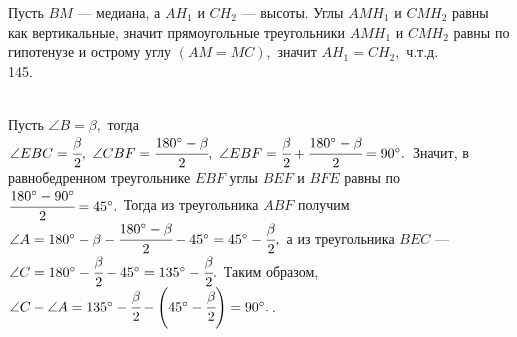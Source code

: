 \documentclass[12pt]{article}
\begin{document}
Пусть $BM$ --- медиана, а $AH_1$ и $CH_2$ --- высоты. Углы $AMH_1$ и $CMH_2$ равны как вертикальные, значит прямоугольные треугольники $AMH_1$ и $CMH_2$ равны по гипотенузе и острому углу $(AM=MC),$ значит $AH_1=CH_2,$ ч.т.д.\\
145. \begin{figure}[ht!]
\end{figure}\\
Пусть $\angle B=\beta,$ тогда $\angle EBC=\cfrac{\beta}{2},\ \angle CBF=\cfrac{180^\circ-\beta}{2},\ \angle EBF=\cfrac{\beta}{2}+\cfrac{180^\circ-\beta}{2}=90^\circ.$ Значит, в равнобедренном треугольнике $EBF$ углы $BEF$ и $BFE$ равны по $\cfrac{180^\circ-90^\circ}{2}=45^\circ.$ Тогда из треугольника $ABF$ получим $\angle A=180^\circ-\beta-\cfrac{180^\circ-\beta}{2}-45^\circ=45^\circ-\cfrac{\beta}{2},$ а из треугольника $BEC$ --- $\angle C=180^\circ-\cfrac{\beta}{2}-45^\circ=135^\circ-\cfrac{\beta}{2}.$ Таким образом, $\angle C-\angle A=135^\circ-\cfrac{\beta}{2} -\left(45^\circ-\cfrac{\beta}{2}\right)=90^\circ.$\newpage{}. \begin{figure}[ht!]
\end{figure}\\
\end{document}

